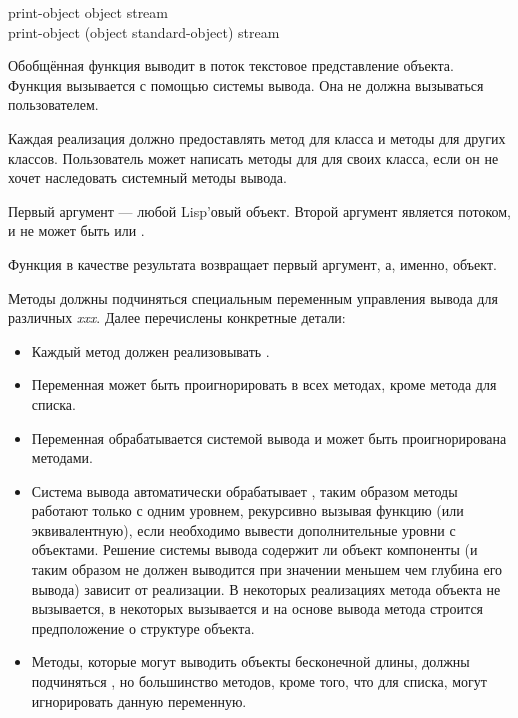 \begin{defun}
print-object object stream \\
print-object (object standard-object) stream

Обобщённая функция  выводит в поток текстовое представление
объекта. Функция  вызывается с помощью системы вывода. Она не
должна вызываться пользователем.

Каждая реализация должно предоставлять метод для класса  и
методы для других классов. Пользователь может написать методы для
 для своих класса, если он не хочет наследовать системный
методы вывода.

Первый аргумент --- любой Lisp'овый объект. Второй аргумент является потоком, и
не может быть  или .

Функция  в качестве результата возвращает первый аргумент, а,
именно, объект.

Методы  должны подчиняться специальным переменным управления вывода
 для различных \emph{xxx}. Далее перечислены конкретные детали:

\begin{itemize}

\item 
Каждый метод должен реализовывать .

\item 
Переменная  может быть проигнорировать в всех методах,
кроме метода для списка.

\item 
Переменная  обрабатывается системой вывода и может быть
проигнорирована методами.

\item 
Система вывода автоматически обрабатывает , таким образом
методы работают только с одним уровнем, рекурсивно вызывая функцию 
(или эквивалентную), если необходимо вывести дополнительные уровни с объектами. 
Решение системы вывода содержит ли объект компоненты (и таким образом не должен
выводится при значении  меньшем чем глубина его вывода)
зависит от реализации. В некоторых реализациях метода объекта 
не вызывается, в некоторых вызывается и на основе вывода метода строится
предположение о структуре объекта.
\item 
Методы, которые могут выводить объекты бесконечной длины, должны подчиняться
, но большинство методов, кроме того, что для списка, могут
игнорировать данную переменную.


\end{itemize}
\end{defun}
